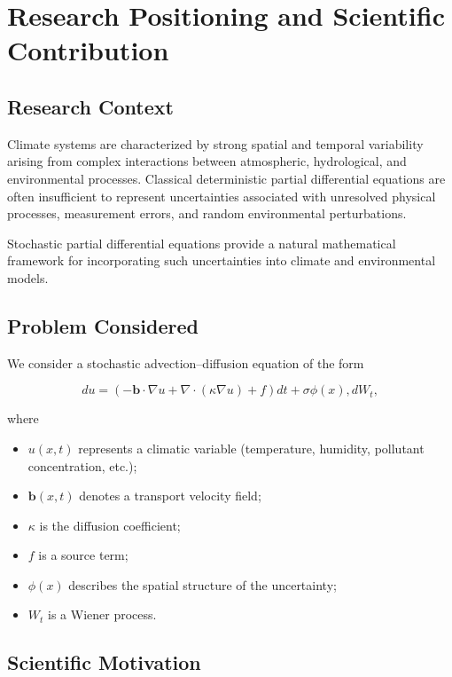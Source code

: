 \section*{Research Positioning and Scientific Contribution}

\subsection*{Research Context}

Climate systems are characterized by strong spatial and temporal variability arising from complex interactions between atmospheric, hydrological, and environmental processes. Classical deterministic partial differential equations are often insufficient to represent uncertainties associated with unresolved physical processes, measurement errors, and random environmental perturbations.

Stochastic partial differential equations provide a natural mathematical framework for incorporating such uncertainties into climate and environmental models.

\subsection*{Problem Considered}

We consider a stochastic advection--diffusion equation of the form

\[
du
=
\left(
-\mathbf b\cdot\nabla u
+
\nabla\cdot(\kappa\nabla u)
+
f
\right)dt
+
\sigma \phi(x),dW_t,
\]

where

\begin{itemize}
\item $u(x,t)$ represents a climatic variable (temperature, humidity, pollutant concentration, etc.);
\item $\mathbf b(x,t)$ denotes a transport velocity field;
\item $\kappa$ is the diffusion coefficient;
\item $f$ is a source term;
\item $\phi(x)$ describes the spatial structure of the uncertainty;
\item $W_t$ is a Wiener process.
\end{itemize}

\subsection*{Scientific Motivation}


